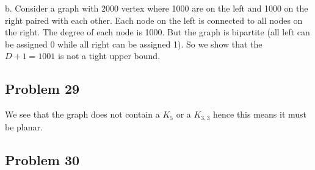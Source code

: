 \documentclass[a4paper]{report}
\begin{document}
b. Consider a graph with 2000 vertex where 1000 are on the left and 1000 on the right  paired with each other. Each node on the left is connected to all nodes on the right. The degree of each node is 1000. But the graph is bipartite (all left can be assigned 0 while all right can be assigned 1). So we show that the $D + 1 = 1001$ is not a tight upper bound.
\subsection*{Problem 29}
We see that the graph does not contain a $K_5$ or a $K_{3,3}$ hence this means it must be planar.


\subsection*{Problem 30}
\end{document}
